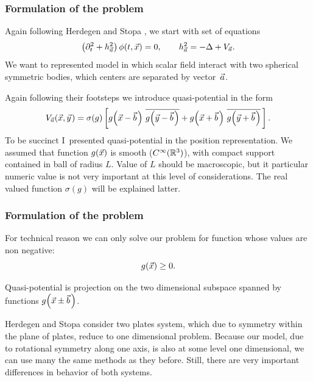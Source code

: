 \documentclass[10pt,t]{beamer}
\begin{document}
\begin{frame}
  \frametitle{Formulation of the problem}


  Again following Herdegen and Stopa
  \parencite{Herdegen-Stopa-Global-vs-local-ETC-2010}, we start with set of
  equations
  \begin{equation}
    \label{eq:Epstein-Glaser-24-A}
    \left( \partial_{ t }^{ 2 } + h_{ \vec{a} }^{ 2 } \right) \phi( t, \vec{x} ) = 0, \qquad
    h_{ \vec{a} }^{ 2 } = -\Delta + V_{ \vec{a} }.
  \end{equation}
  We want to represented model in which scalar field interact with two
  spherical symmetric bodies, which centers are separated by vector~$\vec{a}$.

  Again following their footsteps we introduce quasi-potential in the form
  \begin{equation}
    \label{eq:Model-ukladu-z-dwoma-ETC-08}
    V_{ \vec{a} }( \vec{x}, \vec{y} \hspace{0.09em} ) =
    \sigma( g ) \left[ g\!\left( \vec{x} - \vec{b} \hspace{0.11em} \right) \,
      \overline{ g\!\left( \vec{y} - \vec{b} \hspace{0.11em} \right) }
      + g\!\left( \vec{x} + \vec{b} \hspace{0.11em} \right) \,
      \overline{ g\!\left( \vec{y} + \vec{b} \hspace{0.11em} \right) } \,
    \right].
  \end{equation}
  To be succinct I~presented quasi-potential in the position representation.
  We assumed that function $g( \vec{x} )$ is smooth ($C^{ \infty }( \mathbb{R}^{ 3 } )$),
  with compact support contained in ball of radius $L$. Value of $L$
  should be macroscopic, but it particular numeric value is not very
  important at this level of considerations. The real valued function
  $\sigma( g )$ will be explained latter.

\end{frame}





\begin{frame}
  \frametitle{Formulation of the problem}


  For technical reason we can only solve our problem for function whose
  values are non negative:
  \begin{equation}
    \label{eq:Epstein-Glaser-24-A}
    g( \vec{x} ) \geq 0.
  \end{equation}

  \vspace{-1em}



  Quasi-potential is projection on the two dimensional subspace spanned by
  functions $g\!\left( \vec{x} \pm \vec{b} \hspace{0.11em} \right)$.

  Herdegen and Stopa consider two plates system, which due to symmetry
  within the plane of plates, reduce to one dimensional problem.
  Because our model, due to rotational symmetry along one axis, is
  also at some level one dimensional, we can use many the same methods as
  they before. Still, there are very important differences in behavior
  of both systems.

\end{frame}
\end{document}
